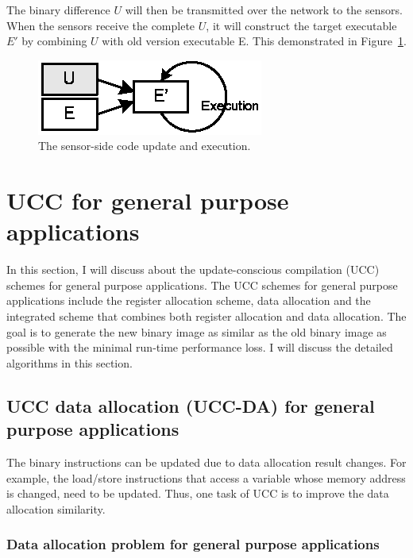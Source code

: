 The binary difference $U$ will then be transmitted over the network to the sensors. When the sensors receive the complete $U$, it will construct the target executable $E'$ by combining $U$ with old version executable {E}. This demonstrated in Figure~\ref{fover.sensor}.

\begin{figure}[htp]
\centering
\includegraphics[scale=1]{figures/com_sensor.eps}
\caption{The sensor-side code update and execution.}
\label{fover.sensor}
\end{figure}

\section{UCC for general purpose applications}

In this section, I will discuss about the update-conscious compilation (UCC) schemes for general purpose applications.
The UCC schemes for general purpose applications include the register allocation scheme, data allocation and
the integrated scheme that combines both register allocation and data allocation.
The goal is to generate the new binary image as similar as the old binary image as possible with the minimal
run-time performance loss. I will discuss the detailed algorithms in this section.


\subsection{UCC data allocation (UCC-DA) for general purpose applications} 

The binary instructions can be updated due to data allocation result changes.
For example, the load/store instructions that access a variable whose memory address is changed,
need to be updated.
Thus, one task of UCC is to improve the data allocation similarity.


\subsubsection{Data allocation problem for general purpose applications}

